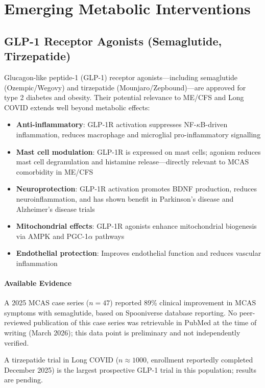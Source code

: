 \section{Emerging Metabolic Interventions}
\label{sec:emerging-metabolic}

\subsection{GLP-1 Receptor Agonists (Semaglutide, Tirzepatide)}
\label{subsec:glp1-agonists}

Glucagon-like peptide-1 (GLP-1) receptor agonists---including semaglutide (Ozempic/Wegovy) and tirzepatide (Mounjaro/Zepbound)---are approved for type 2 diabetes and obesity. Their potential relevance to ME/CFS and Long COVID extends well beyond metabolic effects:
\begin{itemize}
    \item \textbf{Anti-inflammatory}: GLP-1R activation suppresses NF-$\kappa$B-driven inflammation, reduces macrophage and microglial pro-inflammatory signalling
    \item \textbf{Mast cell modulation}: GLP-1R is expressed on mast cells; agonism reduces mast cell degranulation and histamine release---directly relevant to MCAS comorbidity in ME/CFS
    \item \textbf{Neuroprotection}: GLP-1R activation promotes BDNF production, reduces neuroinflammation, and has shown benefit in Parkinson's disease and Alzheimer's disease trials
    \item \textbf{Mitochondrial effects}: GLP-1R agonists enhance mitochondrial biogenesis via AMPK and PGC-1$\alpha$ pathways
    \item \textbf{Endothelial protection}: Improves endothelial function and reduces vascular inflammation
\end{itemize}

\paragraph{Available Evidence}

A 2025 MCAS case series ($n=47$) reported 89\% clinical improvement in MCAS symptoms with semaglutide, based on Spooniverse database reporting. No peer-reviewed publication of this case series was retrievable in PubMed at the time of writing (March 2026); this data point is preliminary and not independently verified.

A tirzepatide trial in Long COVID ($n \approx 1000$, enrollment reportedly completed December 2025) is the largest prospective GLP-1 trial in this population; results are pending.

